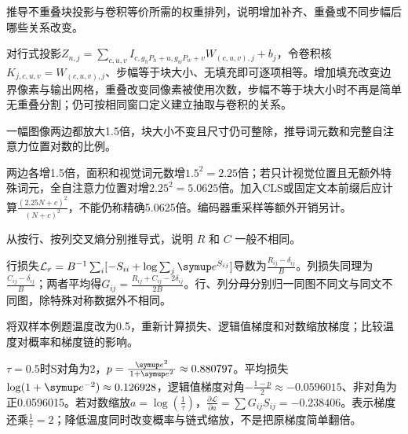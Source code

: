
\begin{exercises}
\begin{exercise} 推导不重叠块投影与卷积等价所需的权重排列，说明增加补齐、重叠或不同步幅后哪些关系改变。

\begin{solution}
对行式投影$Z_{n,j}=\sum_{c,u,v}I_{c,g_hP_h+u,g_wP_w+v}W_{(c,u,v),j}+b_j$，令卷积核$K_{j,c,u,v}=W_{(c,u,v),j}$、步幅等于块大小、无填充即可逐项相等。增加填充改变边界像素与输出网格，重叠改变同像素被使用次数，步幅不等于块大小时不再是简单无重叠分割；仍可按相同窗口定义建立抽取与卷积的关系。
\end{solution}
\end{exercise}

\begin{exercise} 一幅图像两边都放大1.5倍，块大小不变且尺寸仍可整除，推导词元数和完整自注意力位置对数的比例。

\begin{solution}
两边各增1.5倍，面积和视觉词元数增$1.5^2=2.25$倍；若只计视觉位置且无额外特殊词元，全自注意力位置对增$2.25^2=5.0625$倍。加入CLS或固定文本前缀后应计算$\frac{(2.25N+c)^2}{(N+c)^2}$，不能仍称精确5.0625倍。编码器重采样等额外开销另计。
\end{solution}
\end{exercise}

\begin{exercise} 从按行、按列交叉熵分别推导式，说明 $R$ 和 $C$ 一般不相同。

\begin{solution}
行损失$\mathcal L_r=B^{-1}\sum_i[-S_{ii}+\log\sum_j \conste{}^{S_{ij}}]$导数为$\frac{R_{ij}-\delta_{ij}}{B}$。列损失同理为$\frac{C_{ij}-\delta_{ij}}{B}$；两者平均得$G_{ij}=\frac{R_{ij}+C_{ij}-2\delta_{ij}}{2B}$。行、列分母分别归一同图不同文与同文不同图，除特殊对称数据外不相同。
\end{solution}
\end{exercise}

\begin{exercise} 将双样本例题温度改为0.5，重新计算损失、逻辑值梯度和对数缩放梯度；比较温度对概率和梯度链的影响。

\begin{solution}
$\tau=0.5$时S对角为2，$p=\frac{\conste{}^2}{1+\conste{}^2}\approx0.880797$。平均损失$\log(1+\conste{}^{-2})\approx0.126928$，逻辑值梯度对角$-\frac{1-p}{2}\approx-0.0596015$、非对角为正0.0596015。若对数缩放$a=\log(\frac{1}{\tau})$，$\frac{\partial\mathcal L}{\partial a}=\sum G_{ij}S_{ij}=-0.238406$。表示梯度还乘$\frac{1}{\tau}=2$；降低温度同时改变概率与链式缩放，不是把原梯度简单翻倍。
\end{solution}
\end{exercise}


\end{exercises}
